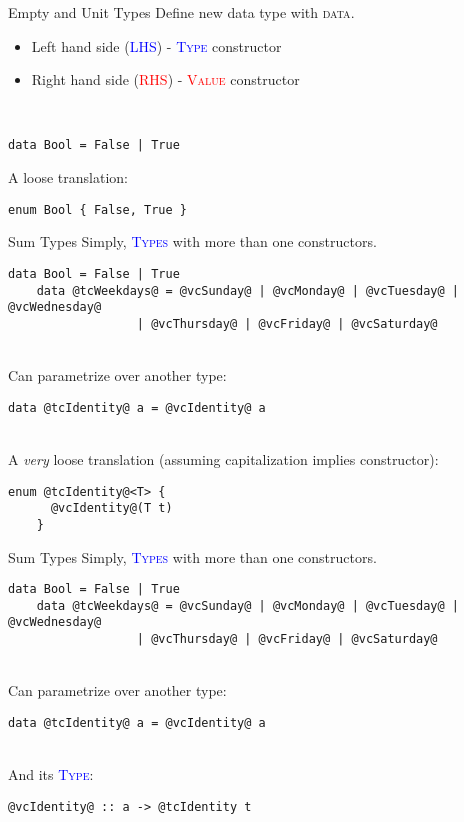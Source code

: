 \documentclass[xcolor={usenames,dvipsnames}]{beamer}
\newcommand{\hkeyword}[1]{\textcolor{TealBlue}{\textsc{#1}}}
\newcommand{\htycon}[1]{\textcolor{Blue}{\textsc{#1}}}
\newcommand{\hvalcon}[1]{\textcolor{Red}{\textsc{#1}}}
\begin{document}
\begin{frame}[fragile]{Empty and Unit Types}
  Define new data type with \hkeyword{data}.
  \begin{itemize}
    \item Left hand side (\htycon{LHS}) - \htycon{Type} constructor
    \item Right hand side (\hvalcon{RHS}) - \hvalcon{Value} constructor
  \end{itemize}

  \ \\
  \begin{lstlisting}[style=hask]
    data Bool = False | True
  \end{lstlisting}

  A loose translation:
  \begin{lstlisting}[style=hask]
    enum Bool { False, True }
  \end{lstlisting}
\end{frame}

\begin{frame}[fragile]{Sum Types}
  Simply, \htycon{Types} with more than one constructors.
  \pause
  \begin{lstlisting}[style=hask]
    data Bool = False | True
    data @tcWeekdays@ = @vcSunday@ | @vcMonday@ | @vcTuesday@ | @vcWednesday@
                  | @vcThursday@ | @vcFriday@ | @vcSaturday@
  \end{lstlisting}

  \pause
  \ \\
  Can parametrize over another type:
  \pause
  \begin{lstlisting}[style=hask]
    data @tcIdentity@ a = @vcIdentity@ a
  \end{lstlisting}

  \pause
  \ \\
  A \textit{very} loose translation \tiny{(assuming capitalization implies constructor)}:
  \begin{lstlisting}[style=hask]
    enum @tcIdentity@<T> {
      @vcIdentity@(T t)
    }
  \end{lstlisting}
\end{frame}

\begin{frame}[fragile]{Sum Types}
  Simply, \htycon{Types} with more than one constructors.
  \begin{lstlisting}[style=hask]
    data Bool = False | True
    data @tcWeekdays@ = @vcSunday@ | @vcMonday@ | @vcTuesday@ | @vcWednesday@
                  | @vcThursday@ | @vcFriday@ | @vcSaturday@
  \end{lstlisting}

  \ \\
  Can parametrize over another type:
  \begin{lstlisting}[style=hask]
    data @tcIdentity@ a = @vcIdentity@ a
  \end{lstlisting}

  \ \\
  And its \htycon{Type}:
  \begin{lstlisting}[style=hask]
    @vcIdentity@ :: a -> @tcIdentity t
  \end{lstlisting}
\end{frame}
\end{document}
